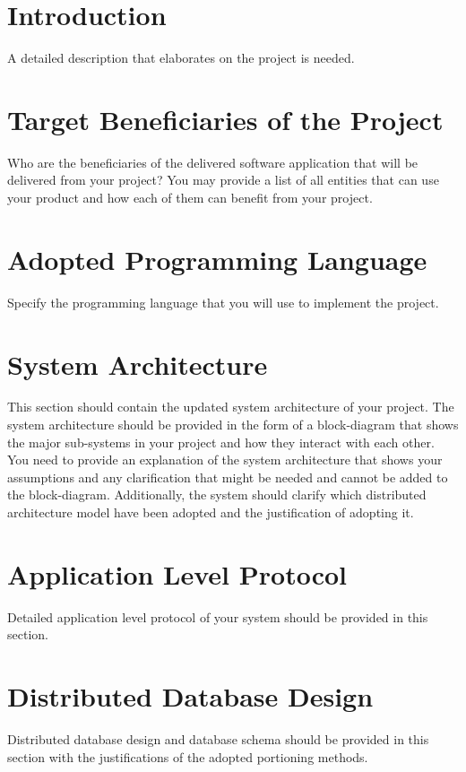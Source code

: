 \documentclass[pdftex,10pt,a4paper,oneside]{article}
\begin{document}
\pagebreak

\tableofcontents

\pagebreak

\section{Introduction}
A detailed description that elaborates on the project is needed.

\section{Target Beneficiaries of the Project}
Who are the beneficiaries of the delivered software application that will be delivered from
your project? You may provide a list of all entities that can use your product and how each
of them can benefit from your project.

\section{Adopted Programming Language}
Specify the programming language that you will use to implement the project.

\section{System Architecture}
This section should contain the updated system architecture of your project. The system architecture should be provided in the form of a block-diagram that shows the major sub-systems in your project and how they interact with each other. You need to provide an explanation of the system architecture that shows your assumptions and any clarification that might be needed and cannot be added to the block-diagram. Additionally, the system should clarify which distributed architecture model have been adopted and the justification of adopting it.

\section{Application Level Protocol}
Detailed application level protocol of your system should be provided in this section.

\section{Distributed Database Design}
Distributed database design and database schema should be provided in this section with
the justifications of the adopted portioning methods.
\end{document}

